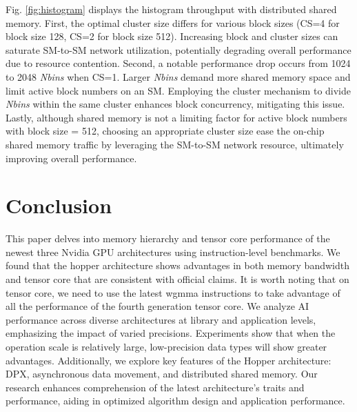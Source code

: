 Fig. \ref{fig:histogram} displays the histogram throughput with distributed shared memory. First, the optimal cluster size differs for various block sizes (CS=4 for block size 128, CS=2 for block size 512). Increasing block and cluster sizes can saturate SM-to-SM network utilization, potentially degrading overall performance due to resource contention. Second, a notable performance drop occurs from 1024 to 2048 \textsl{Nbins} when CS=1. Larger \textsl{Nbins} demand more shared memory space and limit active block numbers on an SM. Employing the cluster mechanism to divide \textsl{Nbins} within the same cluster enhances block concurrency, mitigating this issue. Lastly, although shared memory is not a limiting factor for active block numbers with block size = 512, choosing an appropriate cluster size ease the on-chip shared memory traffic by leveraging the SM-to-SM network resource, ultimately improving overall performance.

\section{Conclusion}

This paper delves into memory hierarchy and tensor core performance of the newest three Nvidia GPU architectures using instruction-level benchmarks. We found that the hopper architecture shows advantages in both memory bandwidth and tensor core that are consistent with official claims. It is worth noting that on tensor core, we need to use the latest wgmma instructions to take advantage of all the performance of the fourth generation tensor core. We analyze AI performance across diverse architectures at library and application levels, emphasizing the impact of varied precisions. Experiments show that when the operation scale is relatively large, low-precision data types will show greater advantages. Additionally, we explore key features of the Hopper architecture: DPX, asynchronous data movement, and distributed shared memory. Our research enhances comprehension of the latest architecture's traits and performance, aiding in optimized algorithm design and application performance.


